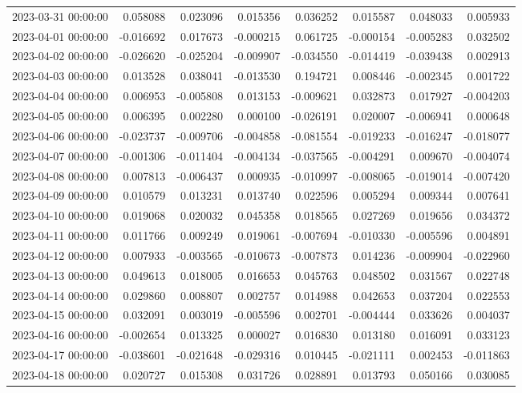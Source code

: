 \begin{tabular}{lrrrrrrr}
2023-03-31 00:00:00 & 0.058088 & 0.023096 & 0.015356 & 0.036252 & 0.015587 & 0.048033 & 0.005933 \\
2023-04-01 00:00:00 & -0.016692 & 0.017673 & -0.000215 & 0.061725 & -0.000154 & -0.005283 & 0.032502 \\
2023-04-02 00:00:00 & -0.026620 & -0.025204 & -0.009907 & -0.034550 & -0.014419 & -0.039438 & 0.002913 \\
2023-04-03 00:00:00 & 0.013528 & 0.038041 & -0.013530 & 0.194721 & 0.008446 & -0.002345 & 0.001722 \\
2023-04-04 00:00:00 & 0.006953 & -0.005808 & 0.013153 & -0.009621 & 0.032873 & 0.017927 & -0.004203 \\
2023-04-05 00:00:00 & 0.006395 & 0.002280 & 0.000100 & -0.026191 & 0.020007 & -0.006941 & 0.000648 \\
2023-04-06 00:00:00 & -0.023737 & -0.009706 & -0.004858 & -0.081554 & -0.019233 & -0.016247 & -0.018077 \\
2023-04-07 00:00:00 & -0.001306 & -0.011404 & -0.004134 & -0.037565 & -0.004291 & 0.009670 & -0.004074 \\
2023-04-08 00:00:00 & 0.007813 & -0.006437 & 0.000935 & -0.010997 & -0.008065 & -0.019014 & -0.007420 \\
2023-04-09 00:00:00 & 0.010579 & 0.013231 & 0.013740 & 0.022596 & 0.005294 & 0.009344 & 0.007641 \\
2023-04-10 00:00:00 & 0.019068 & 0.020032 & 0.045358 & 0.018565 & 0.027269 & 0.019656 & 0.034372 \\
2023-04-11 00:00:00 & 0.011766 & 0.009249 & 0.019061 & -0.007694 & -0.010330 & -0.005596 & 0.004891 \\
2023-04-12 00:00:00 & 0.007933 & -0.003565 & -0.010673 & -0.007873 & 0.014236 & -0.009904 & -0.022960 \\
2023-04-13 00:00:00 & 0.049613 & 0.018005 & 0.016653 & 0.045763 & 0.048502 & 0.031567 & 0.022748 \\
2023-04-14 00:00:00 & 0.029860 & 0.008807 & 0.002757 & 0.014988 & 0.042653 & 0.037204 & 0.022553 \\
2023-04-15 00:00:00 & 0.032091 & 0.003019 & -0.005596 & 0.002701 & -0.004444 & 0.033626 & 0.004037 \\
2023-04-16 00:00:00 & -0.002654 & 0.013325 & 0.000027 & 0.016830 & 0.013180 & 0.016091 & 0.033123 \\
2023-04-17 00:00:00 & -0.038601 & -0.021648 & -0.029316 & 0.010445 & -0.021111 & 0.002453 & -0.011863 \\
2023-04-18 00:00:00 & 0.020727 & 0.015308 & 0.031726 & 0.028891 & 0.013793 & 0.050166 & 0.030085 \\

\end{tabular}
